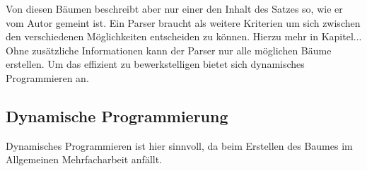 Von diesen Bäumen beschreibt aber nur einer den Inhalt des Satzes so, wie er vom Autor gemeint ist. Ein Parser braucht als weitere Kriterien um sich zwischen den verschiedenen Möglichkeiten entscheiden zu können. Hierzu mehr in Kapitel... %
Ohne zusätzliche Informationen kann der Parser nur alle möglichen Bäume erstellen. Um das effizient zu bewerkstelligen bietet sich dynamisches Programmieren an. 

\subsection{Dynamische Programmierung}
\label{sec:nlp:syn-parsen:dyn-progr}

Dynamisches Programmieren ist hier sinnvoll, da beim Erstellen des Baumes im Allgemeinen Mehrfacharbeit anfällt. 

